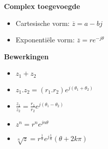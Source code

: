 \documentclass[12pt]{report}
\newcommand{\important}[1] {\textbf{\color{orange}#1}}
\begin{document}
\important{Complex toegevoegde}
\begin{itemize}
 \item Cartesische vorm: $\overline{z} = a - bj$ 
 \item Exponentiële vorm: $\overline{z} = re^{-j\theta}$
\end{itemize}
\important{Bewerkingen}
\begin{itemize}
 \item $z_1 + z_2$
 \item $z_1 . z_2 = (r_1 . r_2)e^{j(\theta_1 + \theta_2)}$
 \item $\frac{z_1}{z_2} = \frac{r_1}{r_2}e^{j(\theta_1 - \theta_2)}$
 \item $z^{n} = r^{n}e^{jn\theta}$
 \item $\sqrt[n]{z} = r^{\frac{1}{n}}e^{j\frac{1}{n}}(\theta + 2k\pi)$
\end{itemize}
\end{document}
